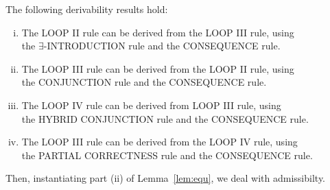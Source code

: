 \documentclass[manuscript, screen, review]{acmart}
\begin{document}
\begin{lemma}[Derivability]
  \label{lem:derivability}
The following derivability results hold:

\begin{enumerate} [(i)]
   \item The {\rm LOOP II} rule can be derived from the {\rm LOOP III} rule, using \\
   the  $\exists$-{\rm INTRODUCTION} rule and the {\rm CONSEQUENCE} rule.
   
    \vspace{2mm}

   \item The {\rm LOOP III} rule can be derived from the {\rm LOOP II} rule, using \\
   the {\rm CONJUNCTION} rule and the {\rm CONSEQUENCE} rule.
   
    \vspace{2mm}

   \item The {\rm LOOP IV} rule can be derived from {\rm LOOP III} rule, using \\
   the  {\rm HYBRID CONJUNCTION} rule and the {\rm CONSEQUENCE} rule.
   
    \vspace{2mm}

   \item The {\rm LOOP III} rule can be derived from the {\rm LOOP IV} rule, using \\
   the {\rm PARTIAL CORRECTNESS} rule and the {\rm CONSEQUENCE} rule.
   
\end{enumerate}

\end{lemma}

Then, instantiating part (ii) of Lemma~\ref{lem:equ}, we deal with admissibilty.
\end{document}
